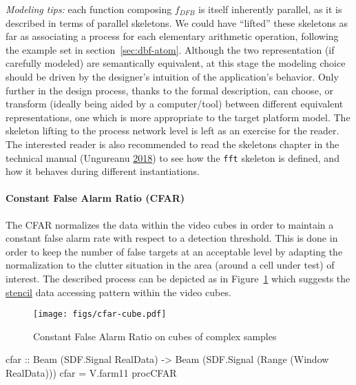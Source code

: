 \documentclass[
  a4paper,
]{article}
\newenvironment{Shaded}{}{}
\newcommand{\DataTypeTok}[1]{\textcolor[rgb]{0.56,0.13,0.00}{#1}}
\newcommand{\FunctionTok}[1]{\textcolor[rgb]{0.02,0.16,0.49}{#1}}
\newcommand{\NormalTok}[1]{#1}
\newcommand{\OtherTok}[1]{\textcolor[rgb]{0.00,0.44,0.13}{#1}}
\let\oldparagraph\paragraph
\renewcommand{\paragraph}[1]{\oldparagraph{#1}\mbox{}}
\begin{document}
\emph{Modeling tips:} each function composing \(f_{DFB}\) is itself
inherently parallel, as it is described in terms of parallel skeletons.
We could have ``lifted'' these skeletons as far as associating a process
for each elementary arithmetic operation, following the example set in
section~\ref{sec:dbf-atom}. Although the two representation (if
carefully modeled) are semantically equivalent, at this stage the
modeling choice should be driven by the designer's intuition of the
application's behavior. Only further in the design process, thanks to
the formal description, can choose, or transform (ideally being aided by
a computer/tool) between different equivalent representations, one which
is more appropriate to the target platform model. The skeleton lifting
to the process network level is left as an exercise for the reader. The
interested reader is also recommended to read the skeletons chapter in
the technical manual (Ungureanu
\protect\hyperlink{ref-atom-manual}{2018}) to see how the \texttt{fft}
skeleton is defined, and how it behaves during different instantiations.

\hypertarget{constant-false-alarm-ratio-cfar}{%
\paragraph{Constant False Alarm Ratio
(CFAR)}\label{constant-false-alarm-ratio-cfar}}

The CFAR normalizes the data within the video cubes in order to maintain
a constant false alarm rate with respect to a detection threshold. This
is done in order to keep the number of false targets at an acceptable
level by adapting the normalization to the clutter situation in the area
(around a cell under test) of interest. The described process can be
depicted as in Figure~\ref{fig:cfar-cube} which suggests the
\href{https://en.wikipedia.org/wiki/Stencil_code}{stencil} data
accessing pattern within the video cubes.

\begin{figure}
\hypertarget{fig:cfar-cube}{%
\centering
\texttt{[image: figs/cfar-cube.pdf]}
\caption{Constant False Alarm Ratio on cubes of complex
samples}\label{fig:cfar-cube}
}
\end{figure}

\begin{Shaded}
\begin{Highlighting}[numbers=left,,firstnumber=389,]
\OtherTok{cfar ::} \DataTypeTok{Beam}\NormalTok{ (}\DataTypeTok{SDF.Signal} \DataTypeTok{RealData}\NormalTok{)}
     \OtherTok{->} \DataTypeTok{Beam}\NormalTok{ (}\DataTypeTok{SDF.Signal}\NormalTok{ (}\DataTypeTok{Range}\NormalTok{ (}\DataTypeTok{Window} \DataTypeTok{RealData}\NormalTok{)))}
\NormalTok{cfar }\FunctionTok{=}\NormalTok{ V.farm11 procCFAR}
\end{Highlighting}
\end{Shaded}
\end{document}
